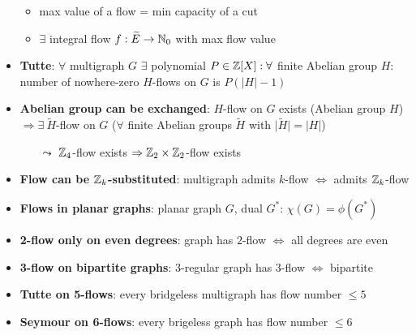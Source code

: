 \begin{itemize}
\begin{itemize}
    \item max value of a flow = min capacity of a cut
    \item \( \exists \) integral flow \( f: \widetilde{E} \to \mathbb{N}_0 \) with max flow value
  \end{itemize}
  \item \textbf{Tutte}: \( \forall \) multigraph \( G \) \( \exists \) polynomial \( P \in \mathbb{Z}[X] : \forall \) finite Abelian group \( H \): number of nowhere-zero \( H \)-flows on \( G \) is \( P \left( \left\vert H \right\vert - 1 \right) \)
  \item \textbf{Abelian group can be exchanged}: \( H \)-flow on \( G \) exists (Abelian group \( H \)) \( \Rightarrow \exists \ \widetilde{H} \)-flow on \( G \) (\( \forall \) finite Abelian groups \( \widetilde{H} \) with \( \vert \widetilde{H} \vert = \left\vert H \right\vert \))
  \begin{itemize}
    \item[\( \leadsto \)] \( \mathbb{Z}_4 \)-flow exists \( \Rightarrow \mathbb{Z}_2 \times \mathbb{Z}_2 \)-flow exists
  \end{itemize}
  \item \textbf{Flow can be \( \mathbb{Z}_k \)-substituted}: multigraph admits \( k \)-flow \( \Leftrightarrow \) admits \( \mathbb{Z}_k \)-flow
  \item \textbf{Flows in planar graphs}: planar graph \( G \), dual \( G^\ast \): \( \chi(G) = \phi(G^\ast) \)
  \item \textbf{2-flow only on even degrees}: graph has \( 2 \)-flow \( \Leftrightarrow \) all degrees are even
  \item \textbf{3-flow on bipartite graphs}: \( 3 \)-regular graph has \( 3 \)-flow \( \Leftrightarrow \) bipartite
  \item \textbf{Tutte on 5-flows}: every bridgeless multigraph has flow number \( \leq 5 \)
  \item \textbf{Seymour on 6-flows}: every brigeless graph has flow number \( \leq 6 \)
\end{itemize}